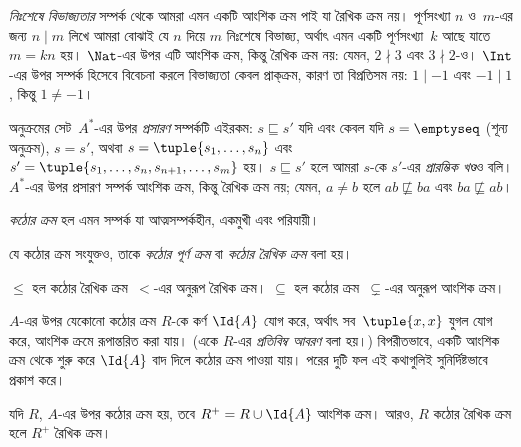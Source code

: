 \documentclass[../../../include/open-logic-section]{subfiles}
\begin{document}
\begin{ex}
\emph{নিঃশেষে বিভাজ্যতার} সম্পর্ক থেকে আমরা এমন একটি আংশিক ক্রম পাই যা রৈখিক ক্রম নয়। পূর্ণসংখ্যা $n$ ও~$m$-এর জন্য $n \mid m$ লিখে আমরা বোঝাই যে $n$ দিয়ে $m$ নিঃশেষে বিভাজ্য, অর্থাৎ এমন একটি পূর্ণসংখ্যা~$k$ আছে যাতে $m = kn$ হয়। $\Nat$-এর উপর এটি আংশিক ক্রম, কিন্তু রৈখিক ক্রম নয়: যেমন, $2 \nmid 3$ এবং $3 \nmid 2$-ও। $\Int$-এর উপর সম্পর্ক হিসেবে বিবেচনা করলে বিভাজ্যতা কেবল প্রাক্‌ক্রম, কারণ তা বিপ্রতিসম নয়: $1 \mid -1$ এবং $-1 \mid 1$, কিন্তু $1 \neq -1$।
\end{ex}

\begin{ex}
অনুক্রমের সেট~$A^*$-এর উপর \emph{প্রসারণ} সম্পর্কটি এইরকম: $s \sqsubseteq s'$ যদি এবং কেবল যদি $s = \emptyseq$ (শূন্য অনুক্রম), $s = s'$, অথবা $s = \tuple{s_1, \dots, s_n}$ এবং $s' = \tuple{s_1, \dots, s_n, s_{n+1}, \dots, s_m}$ হয়। $s \sqsubseteq s'$ হলে আমরা $s$-কে $s'$-এর \emph{প্রারম্ভিক খণ্ড}ও বলি। $A^*$-এর উপর প্রসারণ সম্পর্ক আংশিক ক্রম, কিন্তু রৈখিক ক্রম নয়; যেমন, $a \neq b$ হলে $ab \not\sqsubseteq ba$ এবং $ba \not\sqsubseteq ab$।
\end{ex}

\begin{defn}[কঠোর ক্রম]
\emph{কঠোর ক্রম} হল এমন সম্পর্ক যা আত্মসম্পর্কহীন, একমুখী এবং পরিযায়ী।
\end{defn}

\begin{defn}[কঠোর রৈখিক ক্রম]
যে কঠোর ক্রম সংযুক্তও, তাকে \emph{কঠোর পূর্ণ ক্রম} বা \emph{কঠোর রৈখিক ক্রম} বলা হয়।
\end{defn}

\begin{ex}
$\le$ হল কঠোর রৈখিক ক্রম~$<$-এর অনুরূপ রৈখিক ক্রম। $\subseteq$ হল কঠোর ক্রম~$\subsetneq$-এর অনুরূপ আংশিক ক্রম।
\end{ex}

$A$-এর উপর যেকোনো কঠোর ক্রম $R$-কে কর্ণ $\Id{A}$ যোগ করে, অর্থাৎ সব~$\tuple{x, x}$ যুগল যোগ করে, আংশিক ক্রমে রূপান্তরিত করা যায়। (একে $R$-এর \emph{প্রতিবিম্ব আবরণ} বলা হয়।) বিপরীতভাবে, একটি আংশিক ক্রম থেকে শুরু করে $\Id{A}$ বাদ দিলে কঠোর ক্রম পাওয়া যায়। পরের দুটি ফল এই কথাগুলিই সুনির্দিষ্টভাবে প্রকাশ করে।

\begin{prop}
যদি $R$, $A$-এর উপর কঠোর ক্রম হয়, তবে $R^+ = R \cup \Id{A}$ আংশিক ক্রম। আরও, $R$ কঠোর রৈখিক ক্রম হলে $R^+$ রৈখিক ক্রম।
\end{prop}
\end{document}
